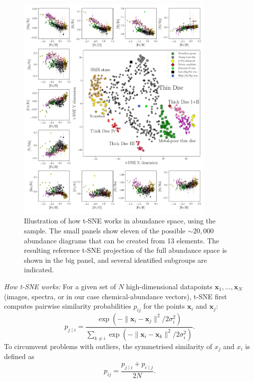 \documentclass{aa}  %
\begin{document}
\begin{figure}\centering
 \includegraphics[width=0.85\textwidth]{im/harps_tsne-abundsplot_teffcut.png}
\caption{Illustration of how t-SNE works in abundance space, using the \citet{DelgadoMena2017} sample. The small panels show eleven of the possible $\sim20,000$ abundance diagrams that can be created from 13 elements. The resulting reference t-SNE projection of the full abundance space is shown in the big panel, and several identified subgroups are indicated.}
\label{harps0}
\end{figure}

{\it How t-SNE works:} For a given set of $N$ high-dimensional datapoints $\mathbf{x}_1, \dots, \mathbf{x}_N$ (images, spectra, or in our case chemical-abundance vectors), t-SNE first computes pairwise similarity probabilities $p_{ij}$ for the points $\mathbf{x}_i$ and $\mathbf{x}_j$:
$$p_{j\mid i} = \frac{\exp(-\lVert\mathbf{x}_i - \mathbf{x}_j\rVert^2 / 2\sigma_i^2)}{\sum_{k \neq i} \exp(-\lVert\mathbf{x}_i - \mathbf{x}_k\rVert^2 / 2\sigma_i^2)}.$$
To circumvent problems with outliers, the symmetrised similarity of $x_j$ and $x_i$ is defined as 
$$p_{ij} = \frac{p_{j\mid i} + p_{i\mid j}}{2N}.$$
\end{document}
